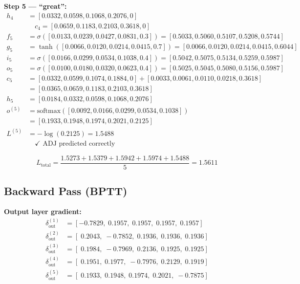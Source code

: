 \textbf{Step 5 --- ``great'':}
\begin{align*}
    h_4 &= [0.0332,0.0598,0.1068,0.2076,0] \\
    &\quad c_4 = [0.0659,0.1183,0.2103,0.3618,0] \\[4pt]
    f_5 &= \sigma([0.0133,0.0239,0.0427,0.0831,0.3])
         = [0.5033,0.5060,0.5107,0.5208,0.5744] \\
    g_5 &= \tanh([0.0066,0.0120,0.0214,0.0415,0.7])
         = [0.0066,0.0120,0.0214,0.0415,0.6044] \\
    i_5 &= \sigma([0.0166,0.0299,0.0534,0.1038,0.4])
         = [0.5042,0.5075,0.5134,0.5259,0.5987] \\
    o_5 &= \sigma([0.0100,0.0180,0.0320,0.0623,0.4])
         = [0.5025,0.5045,0.5080,0.5156,0.5987] \\[4pt]
    c_5 &= [0.0332,0.0599,0.1074,0.1884,0] + [0.0033,0.0061,0.0110,0.0218,0.3618] \\
        &= [0.0365,0.0659,0.1183,0.2103,0.3618] \\[4pt]
    h_5 &= [0.0184,0.0332,0.0598,0.1068,0.2076] \\[4pt]
    o^{(5)} &= \text{softmax}([0.0092,0.0166,0.0299,0.0534,0.1038]) \\
             &= [0.1933,0.1948,0.1974,0.2021,0.2125] \\
    L^{(5)} &= -\log(0.2125) = 1.5488 \\
    &\quad \checkmark \text{ ADJ predicted correctly}
\end{align*}

\begin{equation}
    L_{\text{total}} = \frac{1.5273 + 1.5379 + 1.5942 + 1.5974 + 1.5488}{5} = 1.5611
\end{equation}

\subsection{Backward Pass (BPTT)}

\textbf{Output layer gradient:}
\begin{align*}
    \delta_{\text{out}}^{(1)} &= [-0.7829,\; 0.1957,\; 0.1957,\; 0.1957,\; 0.1957] \\
    \delta_{\text{out}}^{(2)} &= [\; 0.2043,\;-0.7852,\; 0.1936,\; 0.1936,\; 0.1936] \\
    \delta_{\text{out}}^{(3)} &= [\; 0.1984,\;-0.7969,\; 0.2136,\; 0.1925,\; 0.1925] \\
    \delta_{\text{out}}^{(4)} &= [\; 0.1951,\; 0.1977,\;-0.7976,\; 0.2129,\; 0.1919] \\
    \delta_{\text{out}}^{(5)} &= [\; 0.1933,\; 0.1948,\; 0.1974,\; 0.2021,\;-0.7875]
\end{align*}

